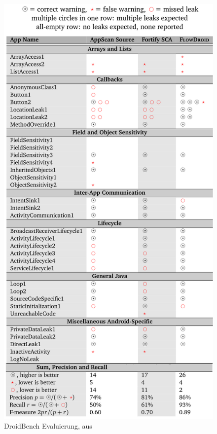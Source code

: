 \documentclass[runningheads]{llncs}
\begin{document}
\begin{figure}[htp]
\centering 
\includegraphics[scale=1]{img/evaluation.png}
\caption{DroidBench Evaluierung, aus \cite{technical}}
\label{fig:eval}
\end{figure} 
\end{document}
